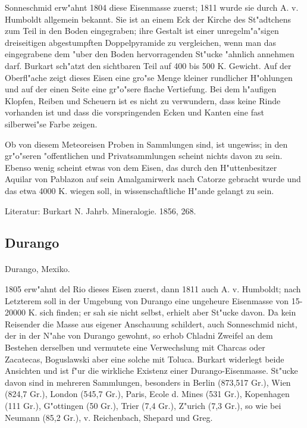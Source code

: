 \documentclass[a4paper, 11pt, oneside]{article}
\begin{document}
Sonneschmid erw"ahnt 1804 diese Eisenmasse zuerst; 1811 wurde sie durch A. v. Humboldt allgemein bekannt. Sie ist an einem Eck der Kirche des St"adtchens zum Teil in den Boden eingegraben; ihre Gestalt ist einer unregelm"a"sigen dreiseitigen abgestumpften Doppelpyramide zu vergleichen, wenn man das eingegrabene dem "uber den Boden hervorragenden St"ucke "ahnlich annehmen darf. Burkart sch"atzt den sichtbaren Teil auf 400 bis 500 K. Gewicht. Auf der Oberfl"ache zeigt dieses Eisen eine gro"se Menge kleiner rundlicher H"ohlungen und auf der einen Seite eine gr"o"sere flache Vertiefung. Bei dem h"aufigen Klopfen, Reiben und Scheuern ist es nicht zu verwundern, dass keine Rinde vorhanden ist und dass die vorspringenden Ecken und Kanten eine fast silberwei"se Farbe zeigen.

Ob von diesem Meteoreisen Proben in Sammlungen sind, ist ungewiss; in den gr"o"seren "offentlichen und Privatsammlungen scheint nichts davon zu sein. Ebenso wenig scheint etwas von dem Eisen, das durch den H"uttenbesitzer Aquilar von Pablazon auf sein Amalgamirwerk nach Catorze gebracht wurde und das etwa 4000 K. wiegen soll, in wissenschaftliche H"ande gelangt zu sein.

Literatur: Burkart N. Jahrb. Mineralogie. 1856, 268.

\subsection{Durango}
\normalsize
\paragraph{}
Durango, Mexiko.

1805 erw"ahnt del Rio dieses Eisen zuerst, dann 1811 auch A. v. Humboldt; nach Letzterem soll in der Umgebung von Durango eine ungeheure Eisenmasse von 15-20000 K. sich finden; er sah sie nicht selbst, erhielt aber St"ucke davon. Da kein Reisender die Masse aus eigener Anschauung schildert, auch Sonneschmid nicht, der in der N"ahe von Durango gewohnt, so erhob Chladni Zweifel an dem Bestehen derselben und vermutete eine Verwechslung mit Charcas oder Zacatecas, Boguslawski aber eine solche mit Toluca. Burkart widerlegt beide Ansichten und ist f"ur die wirkliche Existenz einer Durango-Eisenmasse. St"ucke davon sind in mehreren Sammlungen, besonders in Berlin (873,517 Gr.), Wien (824,7 Gr.), London (545,7 Gr.), Paris, Ecole d. Mines (531 Gr.), Kopenhagen (111 Gr.), G"ottingen (50 Gr.), Trier (7,4 Gr.), Z"urich (7,3 Gr.), so wie bei Neumann (85,2 Gr.), v. Reichenbach, Shepard und Greg.
\end{document}

